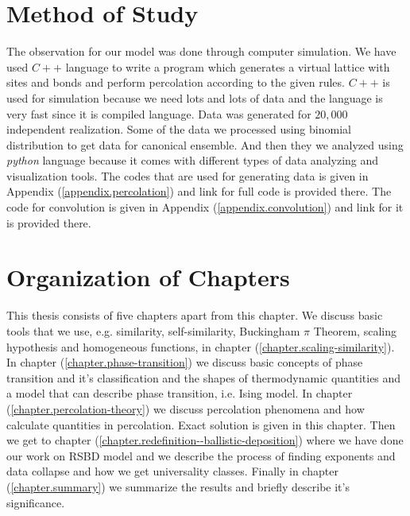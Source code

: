 \section{Method of Study}  %
	The observation for our model was done through computer simulation. We have used $C++$ language to write a program which generates a virtual lattice with sites and bonds and perform percolation according to the given rules. $C++$ is used for simulation because we need lots and lots of data and the language is very fast since it is compiled language. Data was generated for $20,000$ independent realization. Some of the data we processed using binomial distribution \cite{Newman2001} to get data for canonical ensemble. And then they we analyzed using \textit{python} language because it comes with different types of data analyzing and visualization tools. The codes that are used for generating data is given in Appendix (\ref{appendix.percolation}) and link for full code is provided there. The code for convolution is given in Appendix (\ref{appendix.convolution}) and link for it is provided there.

\section{Organization of Chapters}
	This thesis consists of five chapters apart from this chapter. We discuss basic tools that we use, e.g. similarity, self-similarity, Buckingham $\pi$ Theorem, scaling hypothesis and homogeneous functions, in chapter (\ref{chapter.scaling-similarity}). In chapter (\ref{chapter.phase-transition}) we discuss basic concepts of phase transition and it's classification and the shapes of thermodynamic quantities and a model that can describe phase transition, i.e. Ising model. In chapter (\ref{chapter.percolation-theory}) we discuss percolation phenomena and how calculate quantities in percolation. Exact solution is given in this chapter. Then we get to chapter (\ref{chapter.redefinition--ballistic-deposition}) where we have done our work on RSBD model and we describe the process of finding exponents and data collapse and how we get universality classes. Finally in chapter (\ref{chapter.summary}) we summarize the results and briefly describe it's significance.

